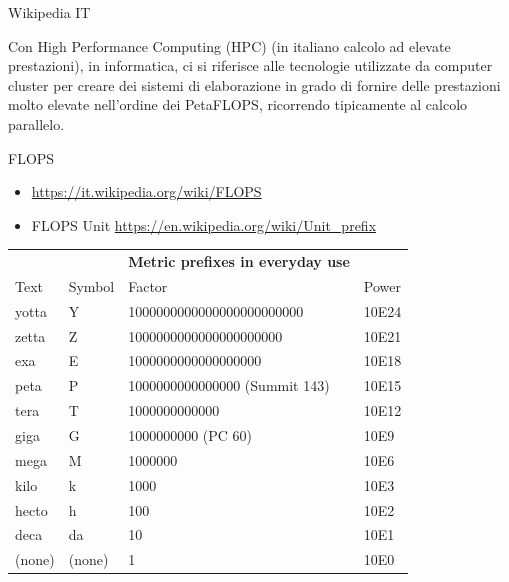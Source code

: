 \documentclass[ignorenonframetext,]{beamer}
\providecommand{\tightlist}{%
  \setlength{\itemsep}{0pt}\setlength{\parskip}{0pt}}
\begin{document}
\begin{frame}{Wikipedia IT}

\begin{description}
\tightlist
\item[\href{https://it.wikipedia.org/wiki/High_Performance_Computing}{HPC}]
Con High Performance Computing (HPC) (in italiano calcolo ad elevate
prestazioni), in informatica, ci si riferisce alle tecnologie utilizzate
da computer cluster per creare dei sistemi di elaborazione in grado di
fornire delle prestazioni molto elevate nell'ordine dei PetaFLOPS,
ricorrendo tipicamente al calcolo parallelo.
\end{description}


\end{frame}

\begin{frame}{FLOPS}

\begin{itemize}
\tightlist
\item
  \url{https://it.wikipedia.org/wiki/FLOPS}
\item
  FLOPS Unit \url{https://en.wikipedia.org/wiki/Unit_prefix}
\end{itemize}


\begin{longtable}[]{@{}llll@{}}
\toprule
\endhead
& & \textbf{Metric prefixes in everyday use} &\tabularnewline
Text & Symbol & Factor & Power\tabularnewline
yotta & Y & 1000000000000000000000000 & 10E24\tabularnewline
zetta & Z & 1000000000000000000000 & 10E21\tabularnewline
exa & E & 1000000000000000000 & 10E18\tabularnewline
peta & P & 1000000000000000 (Summit 143) & 10E15\tabularnewline
tera & T & 1000000000000 & 10E12\tabularnewline
giga & G & 1000000000 (PC 60) & 10E9\tabularnewline
mega & M & 1000000 & 10E6\tabularnewline
kilo & k & 1000 & 10E3\tabularnewline
hecto & h & 100 & 10E2\tabularnewline
deca & da & 10 & 10E1\tabularnewline
(none) & (none) & 1 & 10E0\tabularnewline
\bottomrule
\end{longtable}

\end{frame}
\end{document}
